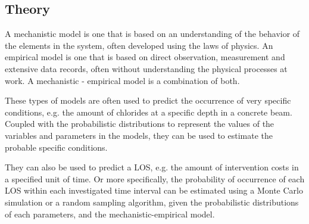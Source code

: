 \subsection{Theory}
A mechanistic model is one that is based on an understanding of the behavior of the elements in the system, often developed using the laws of physics. An empirical model is one that is based on direct observation, measurement and extensive data records, often without understanding the physical processes at work. A mechanistic - empirical model is a combination of both.

These types of models are often used to predict the occurrence of very specific conditions, e.g. the amount of chlorides at a specific depth in a concrete beam. Coupled with the probabilistic distributions to represent the values of the variables and parameters in the models, they can be used to estimate the probable specific conditions.

They can also be used to predict a LOS, e.g. the amount of intervention costs in a specified unit of time. Or more specifically, the probability of occurrence of each LOS within each investigated time interval can be estimated using a Monte Carlo simulation or a random sampling algorithm, given the probabilistic distributions of each parameters, and the mechanistic-empirical model.
%
